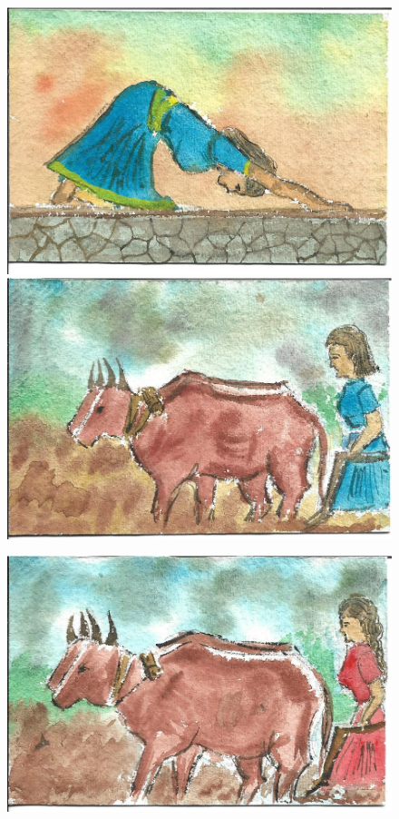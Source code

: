 \documentclass[12pt]{article}
\begin{document}
\begin{figure}[h!]
\includegraphics[width=.331\paperwidth]{pictures/LE}
\hspace*{1cm}\includegraphics[width=.331\paperwidth]{pictures/LP}
\end{figure}

\newpage

\begin{figure}[h!]
\centering
\includegraphics[width=.7\paperwidth]{pictures/AP}
\end{figure}
\end{document}
